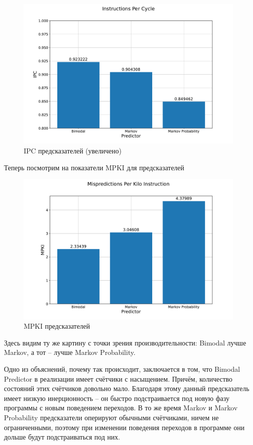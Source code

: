 	\begin{figure}[h!]
		\centering
		\includegraphics[width=\linewidth]{./pictures/ipc_gmean_zoomed.pdf}
		\caption{IPC предсказателей (увеличено)}
	\end{figure}

	\newpage
	Теперь посмотрим на показатели MPKI для предсказателей
	\begin{figure}[h!]
		\centering
		\includegraphics[width=\linewidth]{./pictures/mpki_gmean.pdf}
		\caption{MPKI предсказателей}
	\end{figure}
	
	Здесь видим ту же картину с точки зрения производительности: Bimodal лучше Markov, а тот -- лучше Markov Probability.
	
	Одно из объяснений, почему так происходит, заключается в том, что Bimodal Predictor в реализации имеет счётчики с насыщением. Причём, количество состояний этих счётчиков довольно мало. Благодаря этому данный предсказатель имеет низкую инерционность -- он быстро подстраивается под новую фазу программы с новым поведением переходов. В то же время Markov и Markov Probability предсказатели оперируют обычными счётчиками, ничем не ограниченными, поэтому при изменении поведения переходов в программе они дольше будут подстраиваться под них.
	
